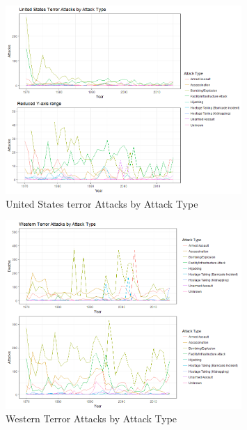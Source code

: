 \documentclass[10pt,a4paper]{article}
\begin{document}
\begin{center}
\begin{figure}[H]
		
	\includegraphics[width=0.8\textwidth]{Plots/AttackType/Attacks.png}
	\caption{United States terror Attacks by Attack Type}

\end{figure}

\begin{figure}[H]
		
	\includegraphics[width=0.8\textwidth]{Plots/AttackType/AttackTypeWesternCountries.png}
	\caption{Western Terror Attacks by Attack Type}

\end{figure}

\begin{figure}[H]


\end{figure}
\end{center}
\end{document}
